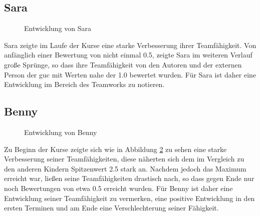 \subsection{Sara}
\begin{figure}[H]
	\centering
	\caption{Entwicklung von Sara}
	\label{img:saraDevelopment}
\end{figure}

Sara zeigte im Laufe der Kurse eine starke Verbesserung ihrer Teamfähigkeit. Von anfänglich einer Bewertung von nicht einmal 0.5, zeigte Sara im weiteren Verlauf große Sprünge, so dass ihre Teamfähigkeit von den Autoren und der externen Person der \acrshort{guc} mit Werten nahe der 1.0 bewertet wurden. Für Sara ist daher eine Entwicklung im Bereich des Teamworks zu notieren.
\subsection{Benny}
\begin{figure}[H]
	\centering
	\label{img:bennyDevelopment}
	\caption{Entwicklung von Benny}
\end{figure}
Zu Beginn der Kurse zeigte sich wie in Abbildung \ref{img:bennyDevelopment} zu sehen eine starke Verbesserung seiner Teamfähigkeiten, diese näherten sich dem im Vergleich zu den anderen Kindern Spitzenwert 2.5 stark an. Nachdem jedoch das Maximum erreicht war, ließen seine Teamfähigkeiten drastisch nach, so dass gegen Ende nur noch Bewertungen von etwa 0.5 erreicht wurden. Für Benny ist daher eine Entwicklung seiner Teamfähigkeit zu vermerken, eine positive Entwicklung in den ersten Terminen und am Ende eine Verschlechterung seiner Fähigkeit.



